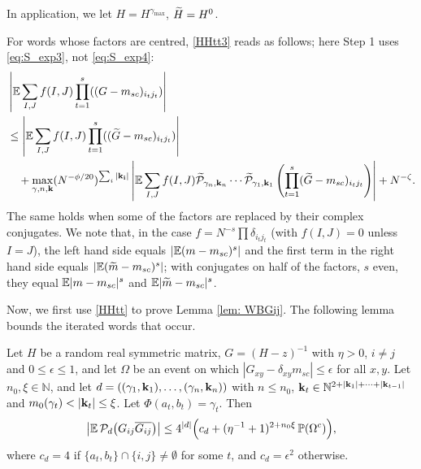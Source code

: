 In application, we let $H=H^{\gamma_{\max}}$, $\widetilde H= H^0$.

For words whose factors are centred, \eqref{HHtt3} reads as follows; here Step 1 uses \eqref{eq:S_exp3}, not \eqref{eq:S_exp4}:
\begin{equation} \label{bssm}
\begin{split}
& \left|\mathbb{E} \sum_{I,J} f(I,J)\prod_{t=1}^s ((G -m_{sc}) _{i_t j_t})\right| \\
&\leq
\left|\mathbb{E} \sum_{I,J} f(I,J)\prod_{t=1}^s ((\widetilde G -m_{sc}) _{i_t j_t})\right| \\
& \quad +
 \max_{\gamma, n, {\bf k}}(N^{-\phi/20})^{\sum_i |{\bf k_i}|}
 \left|\mathbb{E} \sum_{I,J} f(I,J)\widetilde {\mathcal P}_{\gamma_n, {\bf k}_n}\cdots  \widetilde {\mathcal P}_{\gamma_1, {\bf k}_1}  \left(\prod_{t=1}^s (\widetilde G -m_{sc})  _{i_t j_t}\right)\right|+N^{-\zeta}.
\end{split}
\end{equation}
The same holds when some of the factors are replaced by their complex conjugates. We note that, in the case $f=N^{-s}\prod \delta_{i_tj_t}$ (with $f(I,J)=0$ unless $I=J$), the left hand side equals $|\mathbb{E} (m-m_{sc})^s|$ and the first term in the right hand side equals $|\mathbb{E} (\widetilde m-m_{sc})^s|$; with conjugates on half of the factors, $s$ even, they equal $\mathbb{E}|m-m_{sc}|^s$ and $\mathbb{E}|\widetilde m-m_{sc}|^s$.

Now, we first use \eqref{HHtt} to prove Lemma \ref{lem: WBGij}. The following lemma bounds the iterated words that occur.

\begin{lem}\label{lem:words}
Let $H$ be a random real symmetric matrix, $G=(H-z)^{-1}$ with $\eta>0$, $i\ne j$ and $0\le\epsilon\le1$, and let $\Omega$ be an event on which $|G_{xy}-\delta_{xy}m_{sc}|\le\epsilon$ for all $x,y$. Let $n_0,\xi\in\mathbb N$, and let $d=((\gamma_1,{\bf k}_1),\dots,(\gamma_n,{\bf k}_n))$ with $n\le n_0$, ${\bf k}_t\in\mathbb N^{2+|{\bf k}_1|+\dots+|{\bf k}_{t-1}|}$ and $m_0(\gamma_t)<|{\bf k}_t|\le\xi$. Let $\Phi(a_t,b_t)=\gamma_t$. Then
$$
\left|\mathbb{E}\,\mathcal P_d\big(G_{ij}\overline{G_{ij}}\big)\right|\le4^{|d|}\Big(c_d+(\eta^{-1}+1)^{2+n_0\xi}\,\mathbb{P}(\Omega^c)\Big),
$$
where $c_d=4$ if $\{a_t,b_t\}\cap\{i,j\}\ne\emptyset$ for some $t$, and $c_d=\epsilon^2$ otherwise.
\end{lem}

